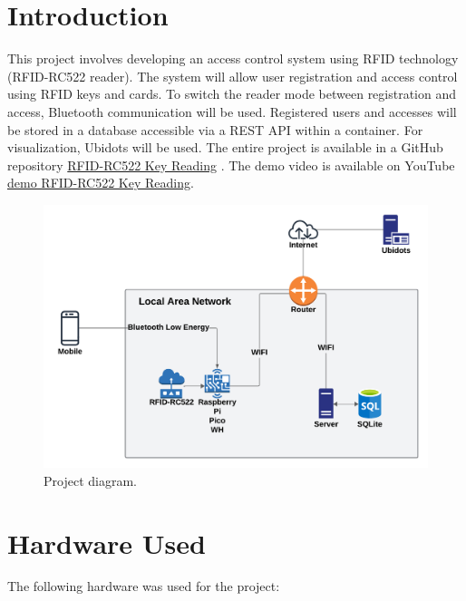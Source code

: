 \documentclass{article}
\begin{document}
\tableofcontents

\newpage


\section{Introduction}

This project involves developing an access control system using RFID technology (RFID-RC522 reader).
The system will allow user registration and access control using RFID keys and cards. 
To switch the reader mode between registration and access, Bluetooth communication will be used. 
Registered users and accesses will be stored in a database accessible via a REST API within a container. 
For visualization, Ubidots will be used.
The entire project is available in a GitHub repository \href{https://github.com/AbelHaro/RFID-RC522-Key-Reading}{RFID-RC522 Key Reading} \cite{abelharo2024lectura}.
The demo video is available on YouTube \href{https://youtu.be/6qB3aYBnV1Q}{demo RFID-RC522 Key Reading}.

\begin{figure}[H]
\centering
\includegraphics[width=0.9\linewidth]{../images/esquema_proyecto.png}
\caption{\label{fig:esquema red}Project diagram.}
\end{figure}

\section{Hardware Used}
The following hardware was used for the project:
\end{document}
